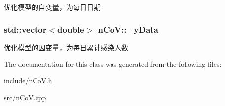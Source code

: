优化模型的自变量，为每日日期 

\subsubsection[{\texorpdfstring{\+\_\+y\+Data}{_yData}}]{\setlength{\rightskip}{0pt plus 5cm}std\+::vector$<$double$>$ n\+Co\+V\+::\+\_\+y\+Data\hspace{0.3cm}{\ttfamily [private]}}\hypertarget{classnCoV_a8e122688ffc8ee32df05f0cb6ef25920}{}\label{classnCoV_a8e122688ffc8ee32df05f0cb6ef25920}


优化模型的因变量，为每日累计感染人数 



The documentation for this class was generated from the following files\+:\begin{DoxyCompactItemize}
\item 
include/\hyperlink{nCoV_8h}{n\+Co\+V.\+h}\item 
src/\hyperlink{nCoV_8cpp}{n\+Co\+V.\+cpp}\end{DoxyCompactItemize}
